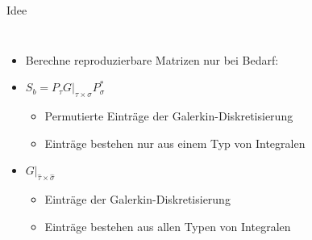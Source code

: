 \documentclass[10pt]{beamer}
\begin{document}
\begin{frame}{Idee}
  \begin{columns}
      \begin{itemize}
        \item Berechne reproduzierbare Matrizen nur bei Bedarf:
        \item \(S_{b} = P_{\tau}G|_{\tau \times \sigma} P_{\sigma}^{*}\)
        \begin{itemize}
          \item Permutierte Einträge der Galerkin-Diskretisierung
          \item Einträge bestehen nur aus einem Typ von
                Integralen\footnotemark[1]\footnotemark[2]
        \end{itemize}
        \item \(G|_{\hat{\tau} \times \hat{\sigma}}\)
        \begin{itemize}
          \item Einträge der Galerkin-Diskretisierung
          \item Einträge bestehen aus allen Typen von Integralen
        \end{itemize}
      \end{itemize}
      \begin{algorithm}[H]
        \begin{algorithmic}[1]
          \normalsize
          {
          \Else{}
            \EndFor{}
          \EndIf{}
        \EndFunction{}
        }
        \end{algorithmic}
      \end{algorithm}
  \end{columns}
  \footnotesize
  \normalsize
\end{frame}
\end{document}
